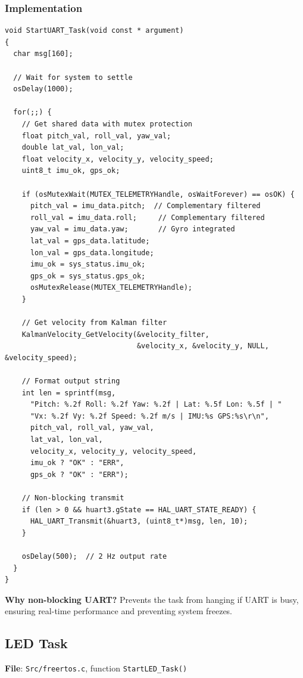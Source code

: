 \documentclass[11pt,a4paper]{article}
\begin{document}
\subsubsection{Implementation}
\begin{lstlisting}[caption=UART Debug Task, label=lst:uarttask]
void StartUART_Task(void const * argument)
{
  char msg[160];
  
  // Wait for system to settle
  osDelay(1000);
  
  for(;;) {
    // Get shared data with mutex protection
    float pitch_val, roll_val, yaw_val;
    double lat_val, lon_val;
    float velocity_x, velocity_y, velocity_speed;
    uint8_t imu_ok, gps_ok;
    
    if (osMutexWait(MUTEX_TELEMETRYHandle, osWaitForever) == osOK) {
      pitch_val = imu_data.pitch;  // Complementary filtered
      roll_val = imu_data.roll;     // Complementary filtered
      yaw_val = imu_data.yaw;       // Gyro integrated
      lat_val = gps_data.latitude;
      lon_val = gps_data.longitude;
      imu_ok = sys_status.imu_ok;
      gps_ok = sys_status.gps_ok;
      osMutexRelease(MUTEX_TELEMETRYHandle);
    }
    
    // Get velocity from Kalman filter
    KalmanVelocity_GetVelocity(&velocity_filter, 
                               &velocity_x, &velocity_y, NULL, &velocity_speed);
    
    // Format output string
    int len = sprintf(msg,
      "Pitch: %.2f Roll: %.2f Yaw: %.2f | Lat: %.5f Lon: %.5f | "
      "Vx: %.2f Vy: %.2f Speed: %.2f m/s | IMU:%s GPS:%s\r\n",
      pitch_val, roll_val, yaw_val,
      lat_val, lon_val,
      velocity_x, velocity_y, velocity_speed,
      imu_ok ? "OK" : "ERR",
      gps_ok ? "OK" : "ERR");
    
    // Non-blocking transmit
    if (len > 0 && huart3.gState == HAL_UART_STATE_READY) {
      HAL_UART_Transmit(&huart3, (uint8_t*)msg, len, 10);
    }
    
    osDelay(500);  // 2 Hz output rate
  }
}
\end{lstlisting}

\textbf{Why non-blocking UART?} Prevents the task from hanging if UART is busy, ensuring real-time performance and preventing system freezes.

\subsection{LED Task}
\textbf{File}: \texttt{Src/freertos.c}, function \texttt{StartLED\_Task()}
\end{document}
